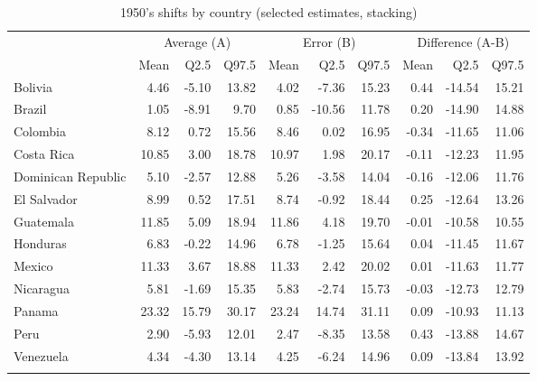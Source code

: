 \renewcommand{\arraystretch}{1.2}
\setlength{\tabcolsep}{10pt}
\begin{table}[htp]
\centering
\caption{1950's shifts by country (selected estimates, stacking)} 
\label{tab:tshift_1950}
\scriptsize
\begin{tabular}{lrrrrrrrrr}
  \hline
  \addlinespace
    & \multicolumn{3}{c}{Average (A)}  & \multicolumn{3}{c}{Error (B)} & \multicolumn{3}{c}{Difference (A-B)}  \\
    \cmidrule(lr){2-4}\cmidrule(lr){5-7}\cmidrule(lr){8-10}
 & Mean & Q2.5 & Q97.5 & Mean & Q2.5 & Q97.5 & Mean & Q2.5 & Q97.5 \\ 
 \addlinespace
  \hline
\addlinespace 
Bolivia & 4.46 & -5.10 & 13.82 & 4.02 & -7.36 & 15.23 & 0.44 & -14.54 & 15.21 \\ 
  Brazil & 1.05 & -8.91 & 9.70 & 0.85 & -10.56 & 11.78 & 0.20 & -14.90 & 14.88 \\ 
  Colombia & 8.12 & 0.72 & 15.56 & 8.46 & 0.02 & 16.95 & -0.34 & -11.65 & 11.06 \\ 
  Costa Rica & 10.85 & 3.00 & 18.78 & 10.97 & 1.98 & 20.17 & -0.11 & -12.23 & 11.95 \\ 
  Dominican Republic & 5.10 & -2.57 & 12.88 & 5.26 & -3.58 & 14.04 & -0.16 & -12.06 & 11.76 \\ 
  El Salvador & 8.99 & 0.52 & 17.51 & 8.74 & -0.92 & 18.44 & 0.25 & -12.64 & 13.26 \\ 
  Guatemala & 11.85 & 5.09 & 18.94 & 11.86 & 4.18 & 19.70 & -0.01 & -10.58 & 10.55 \\ 
  Honduras & 6.83 & -0.22 & 14.96 & 6.78 & -1.25 & 15.64 & 0.04 & -11.45 & 11.67 \\ 
  Mexico & 11.33 & 3.67 & 18.88 & 11.33 & 2.42 & 20.02 & 0.01 & -11.63 & 11.77 \\ 
  Nicaragua & 5.81 & -1.69 & 15.35 & 5.83 & -2.74 & 15.73 & -0.03 & -12.73 & 12.79 \\ 
  Panama & 23.32 & 15.79 & 30.17 & 23.24 & 14.74 & 31.11 & 0.09 & -10.93 & 11.13 \\ 
  Peru & 2.90 & -5.93 & 12.01 & 2.47 & -8.35 & 13.58 & 0.43 & -13.88 & 14.67 \\ 
  Venezuela & 4.34 & -4.30 & 13.14 & 4.25 & -6.24 & 14.96 & 0.09 & -13.84 & 13.92 \\ 
    \addlinespace
\hline
\end{tabular}
\end{table}
